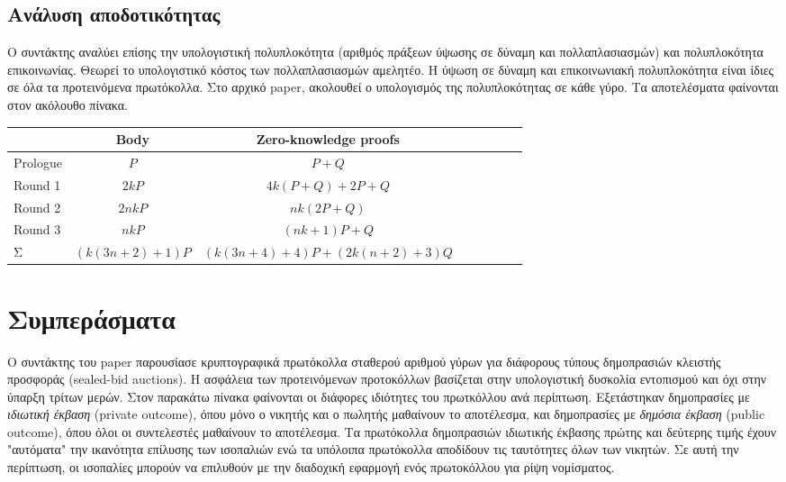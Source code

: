 \documentclass[a4paper,11pt]{article}
\begin{document}
\subsection{Ανάλυση αποδοτικότητας}

Ο συντάκτης αναλύει επίσης την υπολογιστική πολυπλοκότητα (αριθμός πράξεων ύψωσης σε δύναμη και πολλαπλασιασμών) και πολυπλοκότητα επικοινωνίας.
Θεωρεί το υπολογιστικό κόστος των πολλαπλασιασμών αμελητέο. Η ύψωση σε δύναμη και επικοινωνιακή πολυπλοκότητα είναι ίδιες σε όλα τα
προτεινόμενα πρωτόκολλα. Στο αρχικό paper, ακολουθεί ο υπολογισμός της πολυπλοκότητας σε κάθε γύρο. Τα αποτελέσματα φαίνονται στον ακόλουθο πίνακα.

\begin{center}
\begin{tabular}{l*{6}{c}r}
		& Body 	& Zero-knowledge proofs\\
	\hline
	Prologue	& $P$ 				& $P+Q$				\\
	Round 1		& $2kP$				& $4k(P+Q)+2P+Q$	\\
	Round 2		& $2nkP$			& $nk(2P+Q)$		\\
	Round 3		& $nkP$				& $(nk+1)P+Q$		\\
	Σ			& $(k(3n+2)+1)P$	& $(k(3n+4)+4)P+(2k(n+2)+3)Q$\\	
\end{tabular}
\end{center}


\section{Συμπεράσματα} Ο συντάκτης του paper παρουσίασε κρυπτογραφικά πρωτόκολλα σταθερού αριθμού γύρων για διάφορους τύπους δημοπρασιών κλειστής
προσφοράς (sealed-bid auctions). Η ασφάλεια των προτεινόμενων προτοκόλλων βασίζεται στην υπολογιστική δυσκολία εντοπισμού και όχι στην ύπαρξη
τρίτων μερών. Στον παρακάτω πίνακα φαίνονται οι διάφορες ιδιότητες του πρωτκόλλου ανά περίπτωση. Εξετάστηκαν δημοπρασίες με \emph{ιδιωτική έκβαση}
(private outcome), όπου μόνο ο νικητής και ο πωλητής μαθαίνουν το αποτέλεσμα, και δημοπρασίες με \emph{δημόσια έκβαση} (public outcome), όπου όλοι
οι συντελεστές μαθαίνουν το αποτέλεσμα. Τα πρωτόκολλα δημοπρασιών ιδιωτικής έκβασης πρώτης και δεύτερης τιμής έχουν "αυτόματα" την ικανότητα
επίλυσης των ισοπαλιών ενώ τα υπόλοιπα πρωτόκολλα αποδίδουν τις ταυτότητες όλων των νικητών. Σε αυτή την περίπτωση, οι ισοπαλίες μπορούν να
επιλυθούν με την διαδοχική εφαρμογή ενός πρωτοκόλλου για ρίψη νομίσματος.
\end{document}
